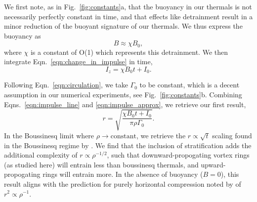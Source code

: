 \documentclass[twocolumn, amsmath, amsfonts, amssymb, trackchanges]{aastex62}
\begin{document}
We first note, as in Fig.~\ref{fig:constants}a, that the buoyancy in our thermals is not necessarily perfectly constant in time, and that effects like detrainment result in a minor reduction of the buoyant signature of our thermals. 
We thus express the buoyancy as 
\begin{equation}
B \approx \chi B_0,
\end{equation}
where $\chi$ is a constant of O(1) which represents this detrainment. 
We then integrate Eqn.~\ref{eqn:change_in_impulse} in time,
\begin{equation*}
I_z = \chi B_0 t + I_0.
\label{eqn:impulse_line}
\end{equation*}

Following Eqn.~\ref{eqn:circulation}, we take $\Gamma_0$ to be constant, which is a decent assumption in our numerical experiments, see Fig.~\ref{fig:constants}b.
Combining Eqns.~\ref{eqn:impulse_line} and \ref{eqn:impulse_approx}, we retrieve our first result,
\begin{equation}
r = \sqrt{\frac{\chi B_0 t + I_0}{\pi\rho\Gamma_0}}.
\label{eqn:r_theory}
\end{equation}
In the Boussinesq limit where $\rho \rightarrow \text{constant}$, we retrieve the $r \propto \sqrt{t}$ scaling found in the Boussinesq regime by \citet{lecoanet&jeevanjee2018}. 
We find that the inclusion of stratification adds the additional complexity of $r \propto \rho^{-1/2}$, such that downward-propogating vortex rings (as studied here) will entrain less than boussinesq thermals, and upward-propogating rings will entrain more. 
In the absence of buoyancy ($B = 0$), this result aligns with the prediction for purely horizontal compression noted by \citet{brandenburg2016} of $r^2 \propto \rho^{-1}$.
\end{document}
